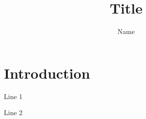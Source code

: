 \documentclass{beamer}
\title{Title}
\author{Name}
\begin{document}
\maketitle

\section{Introduction}

\begin{frame}
  Line 1\pause

  Line 2
\end{frame}
\end{document}
